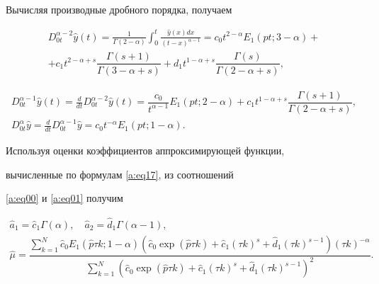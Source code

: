 Вычисляя производные дробного порядка, получаем

\begin{multline}\label{f2_5_101}

D_{0t}^{\alpha-2}\hat{y}(t)=\frac{1}{\Gamma (2-\alpha)}\int_{0}^{t}\frac{\hat{y}  (x) dx}{\left(t-x\right)^{\alpha-1}}=c_0 t^{2-\alpha}E_1(pt;3-\alpha)+\\

+c_1 t^{2-\alpha+s}\dfrac{\Gamma (s+1)}{\Gamma (3-\alpha+s)}+d_1 t^{1-\alpha+s}\dfrac{\Gamma (s)}{\Gamma (2-\alpha+s)}

,

\end{multline}

\begin{gather}

D_{0t}^{\alpha-1}\hat{y}(t)=\frac{d}{dt} D_{0t}^{\alpha-2}\hat{y}(t)=\dfrac{c_0}{ t^{\alpha-1}}E_1(pt;2-\alpha)+c_1 t^{1-\alpha+s}\dfrac{\Gamma (s+1)}{\Gamma (2-\alpha+s)},\\

D_{0t}^{\alpha}\hat{y}=\frac{d}{dt} D_{0t}^{\alpha-1}\hat{y}=c_0 t^{-\alpha} E_1(pt;1-\alpha).

\end{gather}







Используя оценки коэффициентов аппроксимирующей функции,

вычисленные по формулам \eqref{a:eq17}, из соотношений

\eqref{a:eq00} и \eqref{a:eq01} получим

 \begin{gather}   \label{a:eq18}

  \hat{a}_1=\hat{c}_1 \Gamma (\alpha),  \quad  \hat{a}_2=\hat{d}_1 \Gamma (\alpha-1), \\

\hat{\mu}=\dfrac { \sum _{k=1}^{N} {\hat{c}_0 E_1(\hat{p}\tau k;1-\alpha)(\hat{c}_0 \exp(\hat{p}\tau k)+\hat{c}_1 (\tau k)^{s}+\hat{d}_1 (\tau k)^{s-1})}(\tau k)^{-\alpha}}{\sum _{k=1}^{N} {(\hat{c}_0 \exp(\hat{p}\tau k)+\hat{c}_1 (\tau k)^{s}+\hat{d}_1 (\tau k)^{s-1})^2}}.

 \end{gather}

